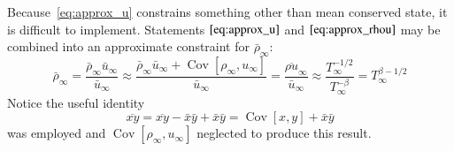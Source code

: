 \documentclass[letterpaper,11pt,nointlimits,reqno]{amsart}
\newcommand{\Cov}[2]{\ensuremath{\operatorname{Cov}\left[{#1},{#2}\right]}}
\newcommand{\Var}[1]{\ensuremath{\operatorname{Var}\left[{#1}\right]}}
\begin{document}
Because~\eqref{eq:approx_u} constrains something other than mean conserved
state, it is difficult to implement.  Statements $\eqref{eq:approx_u}$ and
$\eqref{eq:approx_rhou}$ may be combined into an approximate constraint for
$\bar{\rho}_\infty$:
\begin{equation}
  \bar{\rho}_\infty
  =
  \frac{\bar{\rho}_\infty \bar{u}_\infty}
       {\bar{u}_\infty}
  \approx
  \frac{\bar{\rho}_\infty \bar{u}_\infty + \Cov{\rho_\infty}{u_\infty}}
       {\bar{u}_\infty}
  =
  \frac{\overline{\rho u}_\infty}
       {\bar{u}_\infty}
  \approx
  \frac{T_\infty^{-1/2}}{T_\infty^{-\beta}}
  =
  T_\infty^{\beta-1/2}
\end{equation}
Notice the useful identity
\begin{equation}
  \overline{xy} = \overline{xy} - \bar{x} \bar{y} + \bar{x} \bar{y}
                = \Cov{x}{y} + \bar{x} \bar{y}
\end{equation}
was employed and $\Cov{\rho_\infty}{u_\infty}$ neglected to produce this
result.




\end{document}
